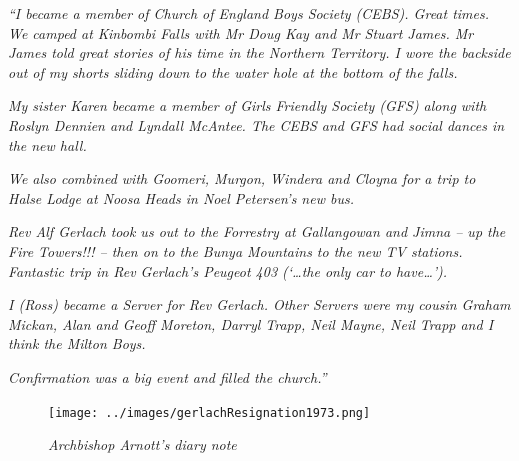 \emph{``I became a member of Church of England Boys Society (CEBS). Great times. We camped at Kinbombi Falls with Mr Doug Kay and Mr Stuart James. Mr James told great stories of his time in the Northern Territory. I wore the backside out of my shorts sliding down to the water hole at the bottom of the falls.}



\smallskip


\emph{My sister Karen became a member of Girls Friendly Society (GFS) along with Roslyn Dennien and Lyndall McAntee. The CEBS and GFS had social dances in the new hall.}



\emph{We also combined with Goomeri, Murgon, Windera and Cloyna for a trip to Halse Lodge at Noosa Heads in Noel Petersen's new bus.}



\smallskip


\emph{Rev Alf Gerlach took us out to the Forrestry at Gallangowan and Jimna -- up the Fire Towers!!! -- then on to the Bunya Mountains to the new TV stations. Fantastic trip in Rev Gerlach's Peugeot 403 (`\ldots the only car to have\ldots').}



\smallskip


\emph{I (Ross) became a Server for Rev Gerlach. Other Servers were my cousin Graham Mickan, Alan and Geoff Moreton, Darryl Trapp, Neil Mayne, Neil Trapp and I think the Milton Boys.}



\smallskip


\emph{Confirmation was a big event and filled the church.''}



\medskip








\begin{figure}[!htb]
\begin{center}
\texttt{[image: ../images/gerlachResignation1973.png]}
\caption{\itshape Archbishop Arnott's diary note}
\end{center}
\end{figure}





